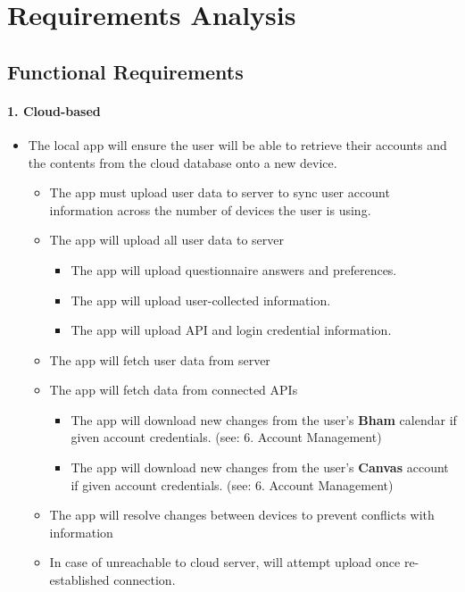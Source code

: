 \documentclass[a4paper,11pt]{article} %
\begin{document}
\newpage

\hypertarget{requirements-analysis}{%
\section{Requirements Analysis}\label{requirements-analysis}}

\hypertarget{functional-requirements}{%
\subsection{Functional Requirements}\label{functional-requirements}}

\hypertarget{cloud-based}{%
\paragraph{1. Cloud-based}\label{cloud-based}}

\begin{itemize}
 
\item
  The local app will ensure the user will be able to retrieve their
  accounts and the contents from the cloud database onto a new device.

  \begin{itemize}
  \item
    The app must upload user data to server to sync user account
    information across the number of devices the user is using.
  \item
    The app will upload all user data to server

    \begin{itemize}
     
    \item
      The app will upload questionnaire answers and preferences.
    \item
      The app will upload user-collected information.
    \item
      The app will upload API and login credential information.
    \end{itemize}
  \item
    The app will fetch user data from server
  \item
    The app will fetch data from connected APIs

    \begin{itemize}
     
    \item
      The app will download new changes from the user's \textbf{Bham}
      calendar if given account credentials. (see: 6. Account
      Management)
    \item
      The app will download new changes from the user's \textbf{Canvas}
      account if given account credentials. (see: 6. Account Management)
    \end{itemize}
  \item
    The app will resolve changes between devices to prevent conflicts
    with information
  \item
    In case of unreachable to cloud server, will attempt upload once
    re-established connection.
  \end{itemize}
\end{itemize}
\end{document}

